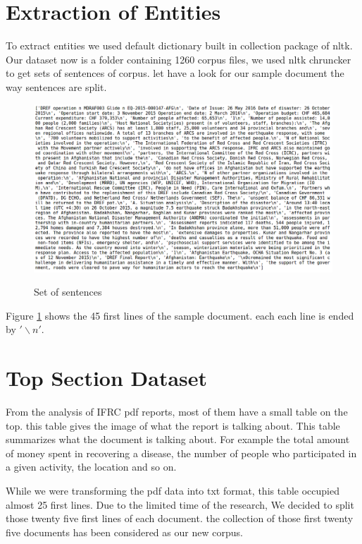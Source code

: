 \section{Extraction of Entities }

To extract entities we used default dictionary built in collection package of nltk. Our dataset now is a folder containing 1260 corpus files, we  used nltk chruncker to get sets of sentences of corpus. let have a look for our sample document the way sentences are split. 
\begin{figure}[hbtp]
\caption{Set of sentences}
\centering
\includegraphics[scale=0.4]{images/corpus.png}\label{Set of sentences}
\end{figure}


Figure \ref{Set of sentences} shows the 45 first lines of the sample document. each each line is ended by  $'\backslash n'$. 

\section{Top Section Dataset \label{top}}

From the analysis of IFRC pdf reports, most of them have a small table on the top. this table gives the image of what the report is talking about. This table summarizes what the document is talking about. For example the total amount of money spent in recovering a disease, the number of people who participated in a given activity, the location and so on.

While we were transforming the pdf data into txt format, this table occupied almost 25 first lines. Due to the limited time of the research, We decided to split those twenty five first lines of each document. the collection of those first twenty five documents has been considered as our new corpus.

